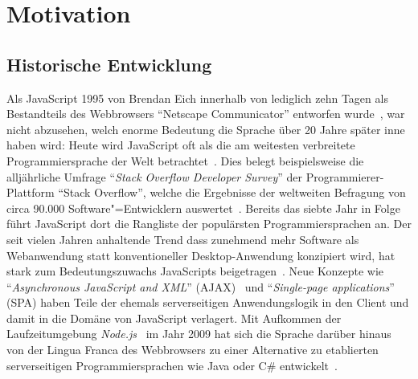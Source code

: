 \chapter{Motivation}
\label{chap:motiviation}

\section{Historische Entwicklung}

Als JavaScript 1995 von Brendan Eich innerhalb von lediglich zehn Tagen als Bestandteils des Webbrowsers \enquote{Netscape Communicator} entworfen wurde~\autocite{severance:2012:js10days}, war nicht abzusehen, welch enorme Bedeutung die Sprache über 20 Jahre später inne haben wird: Heute wird JavaScript oft als die am weitesten verbreitete Programmiersprache der Welt betrachtet~\autocite{CROCKFORD:JS_POPULAR}. Dies belegt beispielsweise die alljährliche Umfrage \enquote{\textit{Stack Overflow Developer Survey}} der Programmierer-Plattform \enquote{Stack Overflow}, welche die Ergebnisse der weltweiten Befragung von circa 90.000 Software"=Entwicklern auswertet~\autocite{STACKOVERFLOW:SURVEY}. Bereits das siebte Jahr in Folge führt JavaScript dort die Rangliste der populärsten Programmiersprachen an. Der seit vielen Jahren anhaltende Trend dass zunehmend mehr Software als Webanwendung statt konventioneller Desktop-Anwendung konzipiert wird, hat stark zum Bedeutungszuwachs JavaScripts beigetragen~\autocite{TAIVALSAARI:2017,CASTELEYN:2014}. Neue Konzepte wie \enquote{\textit{Asynchronous JavaScript and XML}} (AJAX)~\autocite{GARRET:AJAX} und \enquote{\textit{Single-page applications}} (SPA) haben Teile der ehemals serverseitigen Anwendungslogik in den Client und damit in die Domäne von JavaScript verlagert. Mit Aufkommen der Laufzeitumgebung \textit{Node.js}~\autocite{SOFTWARE:NODEJS} im Jahr 2009 hat sich die Sprache darüber hinaus von der Lingua Franca des Webbrowsers zu einer Alternative zu etablierten serverseitigen Programmiersprachen wie Java oder C\# entwickelt~\autocite{TILKOV:NODEJS}.


